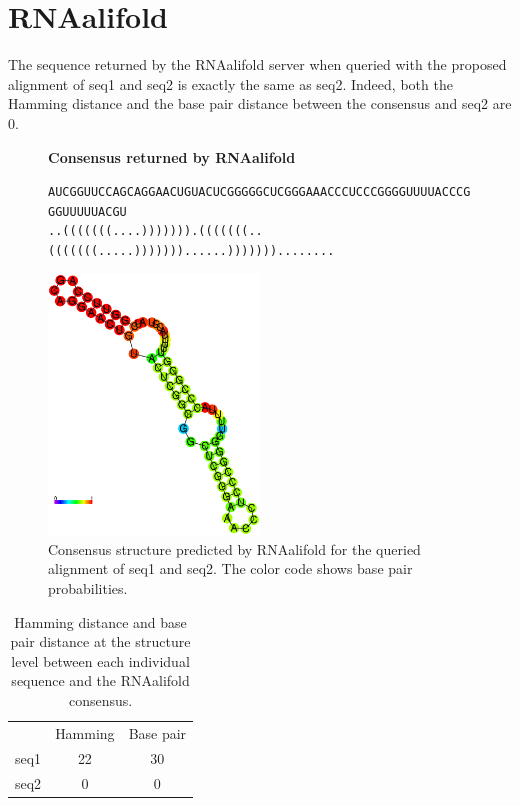 \documentclass[10pt,a4paper]{article}
\begin{document}
\section{RNAalifold}

The sequence returned by the RNAalifold server when queried with the proposed alignment of seq1 and seq2 is exactly the same as seq2. Indeed, both the Hamming distance and the base pair distance between the consensus and seq2 are 0.



\begin{figure}[!h]
\begin{framed}

\textbf{Consensus returned by RNAalifold}

\small{\texttt{AUCGGUUCCAGCAGGAACUGUACUCGGGGGCUCGGGAAACCCUCCCGGGGUUUUACCCGGGUUUUUACGU}} \\
\texttt{..(((((((....))))))).(((((((..(((((((.....)))))))......)))))))........}

\centering    
\includegraphics[width = 0.5\textwidth]{figures/alirna_pp.eps}
\caption{Consensus structure predicted by RNAalifold for the queried alignment of seq1 and seq2. The color code shows base pair probabilities.}
\label{fig:ali}

\end{framed}
\end{figure}



\begin{table}
\begin{center}
  \begin{tabular}{r cc}
    \rowcolor{red!50}
     & Hamming & Base pair \\
seq1 &  22 & 30 \\ seq2 & 0 & 0
  \end{tabular}
  \caption{Hamming distance and base pair distance at the structure level between each individual sequence and the RNAalifold consensus.}
\end{center}
\end{table}
\end{document}
